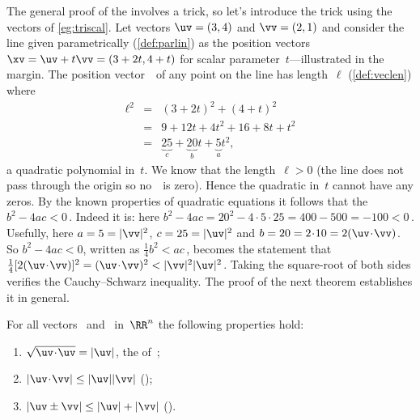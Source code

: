 \begin{example} \label{eg:}
The general proof of the  involves a trick, so let's introduce the trick using the vectors of \autoref{eg:triscal}.
Let vectors \(\uv=(3,4)\) and \(\vv=(2,1)\) and consider the line given parametrically (\autoref{def:parlin}) as the position vectors \(\xv=\uv+t\vv=(3+2t,4+t)\) for scalar parameter~\(t\)---illustrated in the margin.
%
The position vector~\xv\ of any point on the line has length~\(\ell\) (\autoref{def:veclen}) where
\begin{eqnarray*}
\ell^2&=&(3+2t)^2+(4+t)^2
\\&=&9+12t+4t^2+16+8t+t^2
\\&=&\underbrace{25}_{c}+\underbrace{20}_{b}t+\underbrace{5}_{a}t^2,
\end{eqnarray*}
a quadratic polynomial in~\(t\).
We know that the length~\(\ell>0\)  (the line does not pass through the origin so no~\xv\ is zero).
Hence the quadratic in~\(t\) cannot have any zeros.
By the known properties of quadratic equations it follows that the  \(b^2-4ac<0\)\,.
Indeed it is: here \(b^2-4ac=20^2-4\cdot5\cdot25=400-500=-100<0\)\,.
Usefully, here \(a=5=|\vv|^2\), \(c=25=|\uv|^2\) and \(b=20=2\cdot10=2(\uv\cdot\vv)\).
So \(b^2-4ac<0\), written as \(\tfrac14b^2<ac\)\,, becomes the statement that \(\tfrac14[2(\uv\cdot\vv)]^2=(\uv\cdot\vv)^2<|\vv|^2|\uv|^2\).
Taking the square-root of both sides verifies the Cauchy--Schwarz inequality.  
The proof of the next theorem establishes it in general.
\end{example}






\begin{theorem} \label{thm:triscal}
For all vectors \uv\ and \vv\ in~\(\RR^n\) the following properties hold:
\begin{enumerate}
  \item\label{thm:triscala} \(\sqrt{\uv\cdot\uv}=|\uv|\), the  of~\uv;
\item\label{thm:triscalb} \(|\uv\cdot\vv|\leq|\uv||\vv|\) ();
\item\label{thm:triscalc} \(|\uv\pm\vv|\leq|\uv|+|\vv|\) ().
\end{enumerate}
\end{theorem}

